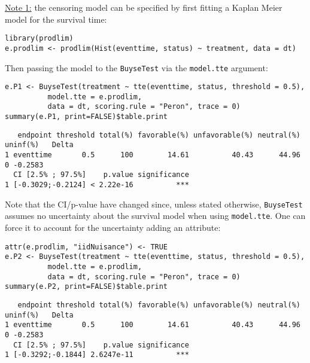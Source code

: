 \documentclass[12pt]{article}
\begin{document}
\bigskip

\uline{Note 1:} the censoring model can be specified by first fitting a
Kaplan Meier model for the survival time:
\lstset{language=r,label= ,caption= ,captionpos=b,numbers=none}
\begin{lstlisting}
library(prodlim)
e.prodlim <- prodlim(Hist(eventtime, status) ~ treatment, data = dt)
\end{lstlisting}

Then passing the model to the \texttt{BuyseTest} via the \texttt{model.tte} argument:
\lstset{language=r,label= ,caption= ,captionpos=b,numbers=none}
\begin{lstlisting}
e.P1 <- BuyseTest(treatment ~ tte(eventtime, status, threshold = 0.5),
		  model.tte = e.prodlim,
		  data = dt, scoring.rule = "Peron", trace = 0)
summary(e.P1, print=FALSE)$table.print
\end{lstlisting}

\begin{verbatim}
   endpoint threshold total(%) favorable(%) unfavorable(%) neutral(%) uninf(%)   Delta
1 eventtime       0.5      100        14.61          40.43      44.96        0 -0.2583
  CI [2.5% ; 97.5%]    p.value significance
1 [-0.3029;-0.2124] < 2.22e-16          ***
\end{verbatim}

Note that the CI/p-value have changed since, unless stated otherwise,
\texttt{BuyseTest} assumes no uncertainty about the survival model when using
\texttt{model.tte}. One can force it to account for the uncertainty adding an attribute:
\lstset{language=r,label= ,caption= ,captionpos=b,numbers=none}
\begin{lstlisting}
attr(e.prodlim, "iidNuisance") <- TRUE
e.P2 <- BuyseTest(treatment ~ tte(eventtime, status, threshold = 0.5),
		  model.tte = e.prodlim,
		  data = dt, scoring.rule = "Peron", trace = 0)
summary(e.P2, print=FALSE)$table.print
\end{lstlisting}

\begin{verbatim}
   endpoint threshold total(%) favorable(%) unfavorable(%) neutral(%) uninf(%)   Delta
1 eventtime       0.5      100        14.61          40.43      44.96        0 -0.2583
  CI [2.5% ; 97.5%]    p.value significance
1 [-0.3292;-0.1844] 2.6247e-11          ***
\end{verbatim}

\bigskip
\end{document}
